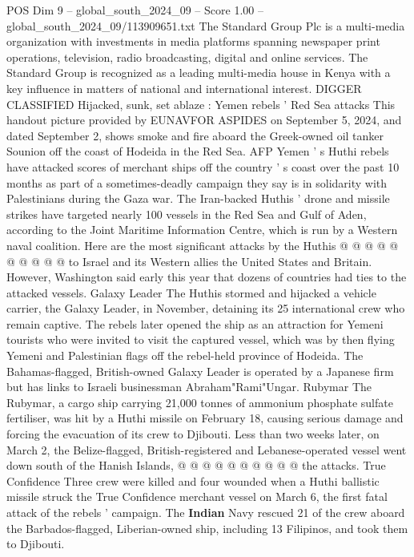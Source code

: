 \begin{textsample}{POS Dim 9 – global\_south\_2024\_09 – Score 1.00 – global\_south\_2024\_09/113909651.txt}  \label{ex:f9_pos_337}
The Standard Group Plc is a multi-media organization with investments in media platforms spanning newspaper print operations, television, radio broadcasting, digital and online services.
The Standard Group is recognized as a leading multi-media house in Kenya with a key influence in matters of national and international interest.
DIGGER CLASSIFIED Hijacked, sunk, set ablaze : Yemen rebels ' Red Sea attacks This handout picture provided by EUNAVFOR ASPIDES on September 5, 2024, and dated September 2, shows smoke and fire aboard the Greek-owned oil tanker Sounion off the coast of Hodeida in the Red Sea.
AFP Yemen ' s Huthi rebels have attacked scores of merchant ships off the country ' s coast over the past 10 months as part of a sometimes-deadly campaign they say is in solidarity with Palestinians during the Gaza war.
The Iran-backed Huthis ' drone and missile strikes have targeted nearly 100 vessels in the Red Sea and Gulf of Aden, according to the Joint Maritime Information Centre, which is run by a Western naval coalition.
Here are the most significant attacks by the Huthis @ @ @ @ @ @ @ @ @ @ to Israel and its Western allies the United States and Britain.
However, Washington said early this year that dozens of countries had ties to the attacked vessels.
Galaxy Leader The Huthis stormed and hijacked a vehicle carrier, the Galaxy Leader, in November, detaining its 25 international crew who remain captive.
The rebels later opened the ship as an attraction for Yemeni tourists who were invited to visit the captured vessel, which was by then flying Yemeni and Palestinian flags off the rebel-held province of Hodeida.
The Bahamas-flagged, British-owned Galaxy Leader is operated by a Japanese firm but has links to Israeli businessman Abraham"Rami"Ungar.
Rubymar The Rubymar, a cargo ship carrying 21,000 tonnes of ammonium phosphate sulfate fertiliser, was hit by a Huthi missile on February 18, causing serious damage and forcing the evacuation of its crew to Djibouti.
Less than two weeks later, on March 2, the Belize-flagged, British-registered and Lebanese-operated vessel went down south of the Hanish Islands, @ @ @ @ @ @ @ @ @ @ the attacks.
True Confidence Three crew were killed and four wounded when a Huthi ballistic missile struck the True Confidence merchant vessel on March 6, the first fatal attack of the rebels ' campaign.
The \textbf{Indian} Navy rescued 21 of the crew aboard the Barbados-flagged, Liberian-owned ship, including 13 Filipinos, and took them to Djibouti.

\end{textsample}
